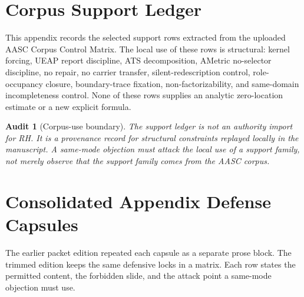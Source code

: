 \documentclass[11pt]{article}
\newtheorem{audit}{Audit}[section]
\begin{document}
\section{Corpus Support Ledger}\label{app:corpus}

This appendix records the selected support rows extracted from the uploaded AASC Corpus Control Matrix.  The local use of these rows is structural: kernel forcing, UEAP report discipline, ATS decomposition, AMetric no-selector discipline, no repair, no carrier transfer, silent-redescription control, role-occupancy closure, boundary-trace fixation, non-factorizability, and same-domain incompleteness control.  None of these rows supplies an analytic zero-location estimate or a new explicit formula.



\begin{audit}[Corpus-use boundary]
The support ledger is not an authority import for RH.  It is a provenance record for structural constraints replayed locally in the manuscript.  A same-mode objection must attack the local use of a support family, not merely observe that the support family comes from the AASC corpus.
\end{audit}


\newpage

\section{Consolidated Appendix Defense Capsules}\label{app:extendedcapsules}

The earlier packet edition repeated each capsule as a separate prose block.  The trimmed edition keeps the same defensive locks in a matrix.  Each row states the permitted content, the forbidden slide, and the attack point a same-mode objection must use.
\end{document}
